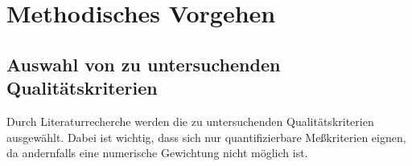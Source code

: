 \documentclass[a4paper,10pt,german,public]{INSOexpose}
\begin{document}
\section{Methodisches Vorgehen}


\subsection{Auswahl von zu untersuchenden Qualitätskriterien}

Durch Literaturrecherche werden die zu untersuchenden Qualitätskriterien
ausgewählt. Dabei ist wichtig, dass sich nur quantifizierbare
Meßkriterien eignen, da andernfalls eine numerische Gewichtung
nicht möglich ist.
\end{document}
